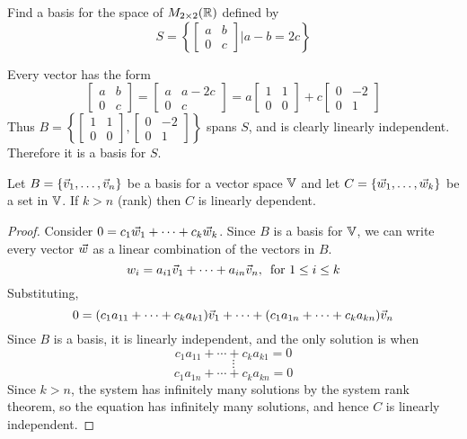 \documentclass[english, 12pt]{article}
\begin{document}
\begin{exmp}
Find a basis for the space of $M_{2\times2}({\mathbb{R}})$ defined by
\[S = \left\{\begin{bmatrix} a & b \\ 0 & c \end{bmatrix} | a-b = 2c\right\}\]
\begin{sol}
Every vector has the form
\[\begin{bmatrix} a & b \\ 0 & c \end{bmatrix} = \begin{bmatrix} a & a-2c \\ 0 & c \end{bmatrix} = a \begin{bmatrix} 1 & 1 \\ 0 & 0 \end{bmatrix} + c \begin{bmatrix} 0 & -2 \\ 0 & 1 \end{bmatrix}\]
Thus $B = \left\{\begin{bmatrix} 1 & 1 \\ 0 & 0 \end{bmatrix}, \begin{bmatrix} 0 & -2 \\ 0 & 1 \end{bmatrix}\right\}$ spans $S$, and is clearly linearly independent. Therefore it is a basis for $S$.
\end{sol}
\end{exmp}

\begin{thrm}
Let $B = \{\vec{v}_1,\dots,\vec{v}_n\}$ be a basis for a vector space ${\mathbb{V}}$ and let $C = \{\vec{w}_1,\dots,\vec{w}_k\}$ be a set in ${\mathbb{V}}$. If $k > n$ (rank) then $C$ is linearly dependent.

\begin{proof}
Consider $0 = c_1\vec{w}_1 + \cdots + c_k \vec{w}_k$. \n
Since $B$ is a basis for ${\mathbb{V}}$, we can write every vector $\vec{w}$ as a linear combination of the vectors in $B$.
\[w_i = a_{i1}\vec{v}_1 + \cdots + a_{in} \vec{v}_n,\, \text{ for } 1 \leq i \leq k\]
Substituting,
\[ 0 = (c_1  a_{11} + \cdots + c_k a_{k1})\vec{v}_1 + \cdots + (c_1 a_{1n} + \cdots + c_k a_{kn}) \vec{v}_n\]
Since $B$ is a basis, it is linearly independent, and the only solution is when
\[c_1 a_{11} + \cdots + c_k a_{k1} = 0\]
\[\vdots\]
\[c_1 a_{1n} + \cdots + c_k a_{kn} = 0\]
Since $k > n$, the system has infinitely many solutions by the system rank theorem, so the equation has infinitely many solutions, and hence $C$ is linearly independent.
\end{proof}
\end{thrm}
\end{document}
